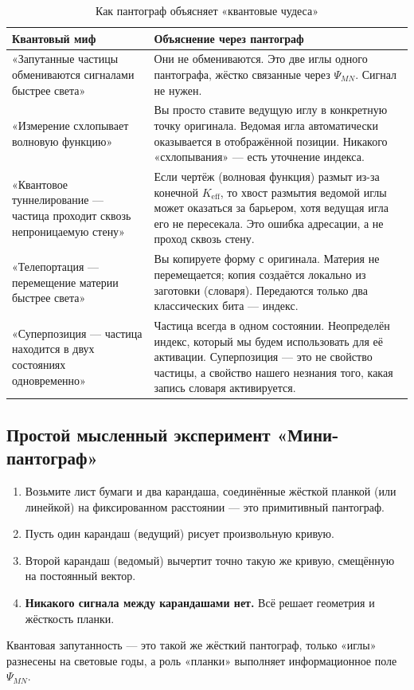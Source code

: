 \documentclass[12pt,a4paper]{article}
\begin{document}
	\begin{table}[htbp]
		\centering
		\caption{Как пантограф объясняет «квантовые чудеса»}
		\label{tab:myths}
		\begin{tabular}{|p{4.5cm}|p{9cm}|}
			\hline
			\textbf{Квантовый миф} & \textbf{Объяснение через пантограф} \\
			\hline
			«Запутанные частицы обмениваются сигналами быстрее света» & Они не обмениваются. Это две иглы одного пантографа, жёстко связанные через \(\Psi_{MN}\). Сигнал не нужен. \\
			\hline
			«Измерение схлопывает волновую функцию» & Вы просто ставите ведущую иглу в конкретную точку оригинала. Ведомая игла автоматически оказывается в отображённой позиции. Никакого «схлопывания» — есть уточнение индекса. \\
			\hline
			«Квантовое туннелирование — частица проходит сквозь непроницаемую стену» & Если чертёж (волновая функция) размыт из-за конечной \(K_{\mathrm{eff}}\), то хвост размытия ведомой иглы может оказаться за барьером, хотя ведущая игла его не пересекала. Это ошибка адресации, а не проход сквозь стену. \\
			\hline
			«Телепортация — перемещение материи быстрее света» & Вы копируете форму с оригинала. Материя не перемещается; копия создаётся локально из заготовки (словаря). Передаются только два классических бита — индекс. \\
			\hline
			«Суперпозиция — частица находится в двух состояниях одновременно» & Частица всегда в одном состоянии. Неопределён индекс, который мы будем использовать для её активации. Суперпозиция — это не свойство частицы, а свойство нашего незнания того, какая запись словаря активируется. \\
			\hline
		\end{tabular}
	\end{table}
	
	\subsection{Простой мысленный эксперимент «Мини-пантограф»}
	
	\begin{enumerate}
		\item Возьмите лист бумаги и два карандаша, соединённые жёсткой планкой (или линейкой) на фиксированном расстоянии — это примитивный пантограф.
		\item Пусть один карандаш (ведущий) рисует произвольную кривую.
		\item Второй карандаш (ведомый) вычертит точно такую же кривую, смещённую на постоянный вектор.
		\item \textbf{Никакого сигнала между карандашами нет.} Всё решает геометрия и жёсткость планки.
	\end{enumerate}
	Квантовая запутанность — это такой же жёсткий пантограф, только «иглы» разнесены на световые годы, а роль «планки» выполняет информационное поле \(\Psi_{MN}\).
	
\end{document}
